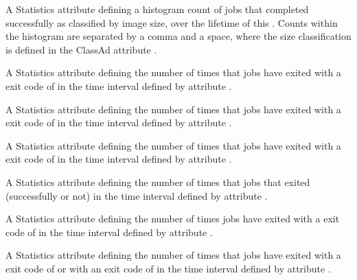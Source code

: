 \begin{description}
\item[\AdAttr{JobsCompletedSizes}:] A Statistics attribute defining
  a histogram count of jobs that completed successfully
  as classified by image size,
  over the lifetime of this .
  Counts within the histogram are separated by a comma and a space, 
  where the size classification is defined in the ClassAd attribute
  .

\item[\AdAttr{JobsCoredumped}:] A Statistics attribute defining
  the number of times that jobs have exited 
  with a  exit code of 
  in the time interval defined by attribute .

\item[\AdAttr{JobsDebugLogError}:] A Statistics attribute defining
  the number of times that jobs have exited 
  with a  exit code of 
  in the time interval defined by attribute .

\item[\AdAttr{JobsExecFailed}:]  A Statistics attribute defining
  the number of times that jobs have exited 
  with a  exit code of 
  in the time interval defined by attribute .

\item[\AdAttr{JobsExited}:]  A Statistics attribute defining
  the number of times that jobs that exited 
  (successfully or not)
  in the time interval defined by attribute .

\item[\AdAttr{JobsExitedAndClaimClosing}:]  A Statistics attribute defining
  the number of times jobs have exited 
  with a  exit code of 
  in the time interval defined by attribute .

\item[\AdAttr{JobsExitedNormally}:]  A Statistics attribute defining
  the number of times that jobs have exited 
  with a  exit code of  or with an
  exit code of 
  in the time interval defined by attribute .


\end{description}
